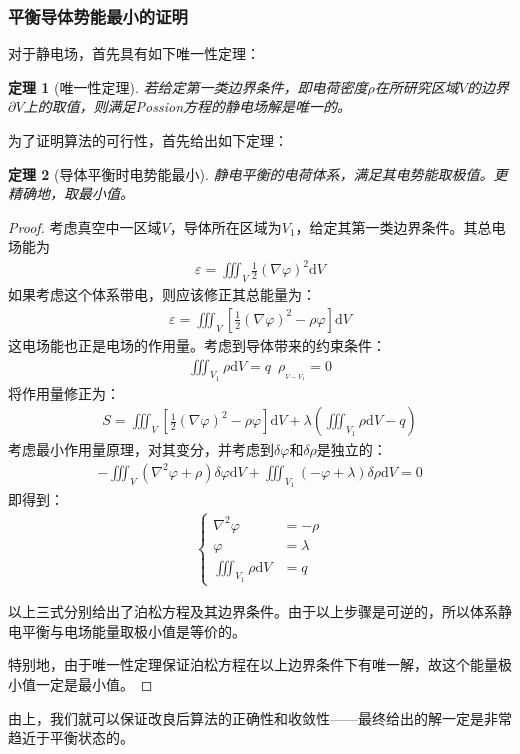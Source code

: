 \documentclass[UTF8]{article}
\numberwithin{figure}{subsection}
\numberwithin{table}{subsection}
\newtheorem{theorem}{\indent 定理}[subsection]
\begin{document}
\begin{multicols}{2}
    \subsubsection{平衡导体势能最小的证明}
    \par 对于静电场，首先具有如下唯一性定理：
    \begin{theorem}[唯一性定理]
        若给定第一类边界条件，即电荷密度$\rho$在所研究区域$V$的边界$\partial V$上的取值，则满足Possion方程的静电场解是唯一的。
    \end{theorem}
    \par 为了证明算法的可行性，首先给出如下定理\cite{zxzyl}：
    \begin{theorem}[导体平衡时电势能最小]
        静电平衡的电荷体系，满足其电势能取极值。更精确地，取最小值。
    \end{theorem}
    \begin{proof}
        考虑真空中一区域$V$，导体所在区域为$V_1$，给定其第一类边界条件。其总电场能为
        \begin{align}
            \varepsilon=\iiint_V \frac12 (\nabla \varphi)^2\mathrm dV
        \end{align}
        如果考虑这个体系带电，则应该修正其总能量为：
        \begin{align}
            \varepsilon=\iiint_V [\frac12 (\nabla \varphi)^2-\rho \varphi]\mathrm dV
        \end{align}
        这电场能也正是电场的作用量。考虑到导体带来的约束条件：
        \begin{align}
            \iiint_{V_1} \rho \mathrm dV=q\,\,\, \rho_{_{V-V_1}}=0
        \end{align}
        将作用量修正为：
        \begin{align}
            S=\iiint_V [\frac12 (\nabla \varphi)^2-\rho \varphi]\mathrm dV +\lambda (\iiint_{V_1}\rho \mathrm dV-q)
        \end{align}
        考虑最小作用量原理，对其变分，并考虑到$\delta \varphi$和$\delta \rho$是独立的：
        \begin{align}
            -\iiint_V(\nabla^2\varphi + \rho)\delta \varphi \mathrm dV + \iiint_{V_1}(-\varphi+\lambda)\delta \rho \mathrm dV=0
        \end{align}
        即得到：
        \begin{align}
            \left\{
                \begin{aligned}
                    \nabla^2\varphi &= -\rho\\
                    \varphi &=\lambda \\
                    \iiint_{V_1}\rho \mathrm dV&=q
                \end{aligned}
            \right.
        \end{align}
        \par 以上三式分别给出了泊松方程及其边界条件。由于以上步骤是可逆的，所以体系静电平衡与电场能量取极小值是等价的。
        \par 特别地，由于唯一性定理保证泊松方程在以上边界条件下有唯一解，故这个能量极小值一定是最小值。
    \end{proof}
    \par 由上，我们就可以保证改良后算法的正确性和收敛性——最终给出的解一定是非常趋近于平衡状态的。

\end{multicols}
\end{document}
